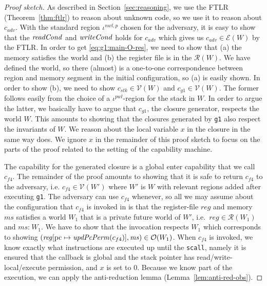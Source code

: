 \documentclass[format=acmsmall, review=true, screen=true]{acmart}
\renewcommand{\sectionname}{Section}
\newcommand{\var}[1]{\mathit{#1}}
\newcommand{\hs}{\var{ms}}
\newcommand{\ms}{\hs}
\newcommand{\pcreg}{\mathrm{pc}}
\newcommand{\reg}{\var{reg}}
\newcommand{\heap}{\var{mem}}
\newcommand{\adv}{\var{adv}}
\newcommand{\stk}{\var{stk}}
\newcommand{\plainfun}[2]{
  \ifthenelse{\equal{#2}{}}
  {\mathit{#1}}
  {\mathit{#1}(#2)}
}
\newcommand{\updatePcPerm}[1]{\plainfun{updPcPerm}{#1}}
\newcommand{\readCond}[1]{\plainfun{readCond}{#1}}
\newcommand{\writeCond}[1]{\plainfun{writeCond}{#1}}
\newcommand{\heapSat}[3][\heap]{#1 :_{#2} #3}
\newcommand{\memSat}[3][n]{\heapSat[#2]{#1}{#3}}
\newcommand{\asmType}{\plaindom{AsmType}}
\newcommand{\plaindom}[1]{\mathrm{#1}}
\newcommand{\intr}[2]{\mathcal{#1}}
\newcommand{\valueintr}[1]{\intr{V}{#1}}
\newcommand{\exprintr}[1]{\intr{E}{#1}}
\newcommand{\regintr}[1]{\intr{R}{#1}}
\newcommand{\stdvr}{\valueintr{\asmType}}
\newcommand{\stder}{\exprintr{\asmType}}
\newcommand{\stdrr}{\regintr{\asmType}}
\newcommand{\observations}{\mathcal{O}}
\newenvironment{toplas}%
    {\color{OliveGreen}}{}
\begin{document}
\begin{toplas}
\begin{proof}[Proof sketch]
  As described in \sectionname~\ref{sec:reasoning}, we use the FTLR (Theorem~\ref{thm:ftlr}) to reason about unknown code, so we use it to reason about $c_\adv$.
  With the standard region $\iota^{nwl,p}$ chosen for the adversary, it is easy to show that the $\readCond{}$ and $\writeCond{}$ holds for $c_\adv$ which gives us $c_\adv \in \stder(W)$ by the FTLR.
  In order to get \eqref{eq:g1:main-O-res}, we need to show that (a) the memory satisfies the world and (b) the register file is in the $\stdrr(W)$.
  We have defined the world, so there (almost) is a one-to-one correspondence between region and memory segment in the initial configuration, so (a) is easily shown.
  In order to show (b), we need to show $c_\stk \in \stdvr(W)$ and $c_{g1} \in \stdvr(W)$.
  The former follows easily from the choice of a $\iota^{pwl}$-region for the stack in $W$.
  In order to argue the latter, we basically have to argue that $c_{g1}$, the closure generator, respects the world $W$.
  This amounts to showing that the closures generated by \texttt{g1} also respect the invariants of $W$.
  We reason about the local variable $x$ in the closure in the same way \citet{Dreyer:jfp12} does.
  We ignore $x$ in the remainder of this proof sketch to focus on the parts of the proof related to the setting of the capability machine.

  The capability for the generated closure is a global enter capability that we call $c_{f4}$.
  The remainder of the proof amounts to showing that it is safe to return $c_{f4}$ to the adversary, i.e.
  $c_{f4} \in \stdvr(W')$ where $W'$ is $W$ with relevant regions added after executing \texttt{g1}.
  The adversary can use $c_{f4}$ whenever, so all we may assume about the configuration that $c_{f4}$ is invoked in is that the register-file $\reg$ and memory $\ms$ satisfies a world $W_1$ that is a private future world of $W'$, i.e.\ $\reg \in \stdrr(W_1)$ and $\memSat[]{\ms}{W_1}$.
  We have to show that the invocation respects $W_1$ which corresponds to showing $(\reg[\pcreg \mapsto \updatePcPerm{c_{f4}}],\ms) \in \observations(W_1)$.
  When $c_{f4}$ is invoked, we know exactly what instructions are executed up until the \texttt{scall}, namely it is ensured that the callback is global and the stack pointer has read/write-local/execute permission, and $x$ is set to 0.
  Because we know part of the execution, we can apply the anti-reduction lemma (Lemma~\ref{lem:anti-red-obs}).
  

\end{proof}
\end{toplas}
\end{document}
